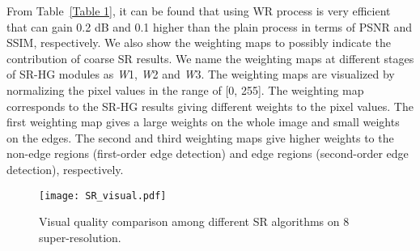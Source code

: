 \documentclass[10pt,twocolumn,letterpaper]{article}
\begin{document}
From Table~\ref{Table 1}, it can be found that using WR process is very efficient that can gain 0.2 dB and 0.1 higher than the plain process in terms of PSNR and SSIM, respectively. We also show the weighting maps to possibly indicate the contribution of coarse SR results. We name the weighting maps at different stages of SR-HG modules as \textit{W}1, \textit{W}2 and \textit{W}3. The weighting maps are visualized by normalizing the pixel values in the range of [0, 255]. The weighting map corresponds to the SR-HG results giving different weights to the pixel values. The first weighting map gives a large weights on the whole image and small weights on the edges. The second and third weighting maps give higher weights to the non-edge regions (first-order edge detection) and edge regions (second-order edge detection), respectively.
\begin{figure*}[t]
\vskip 0.01in
\begin{center}
\centerline{\texttt{[image: SR\_visual.pdf]}}
\caption{Visual quality comparison among different SR algorithms on 8 super-resolution.}
\label{Figure 9}
\end{center}
\vskip -0.3in
\end{figure*}
\end{document}
